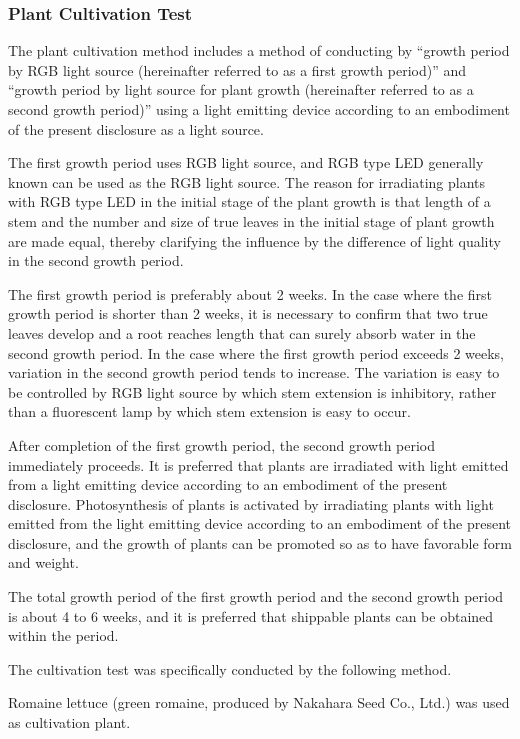 \documentclass[11pt,a4paper]{article}
\begin{document}
\subsubsection{Plant Cultivation Test}

The plant cultivation method includes a method of conducting by “growth period by RGB light source (hereinafter referred to as a first growth period)” and “growth period by light source for plant growth (hereinafter referred to as a second growth period)” using a light emitting device according to an embodiment of the present disclosure as a light source.

The first growth period uses RGB light source, and RGB type LED generally known can be used as the RGB light source. The reason for irradiating plants with RGB type LED in the initial stage of the plant growth is that length of a stem and the number and size of true leaves in the initial stage of plant growth are made equal, thereby clarifying the influence by the difference of light quality in the second growth period.

The first growth period is preferably about 2 weeks. In the case where the first growth period is shorter than 2 weeks, it is necessary to confirm that two true leaves develop and a root reaches length that can surely absorb water in the second growth period. In the case where the first growth period exceeds 2 weeks, variation in the second growth period tends to increase. The variation is easy to be controlled by RGB light source by which stem extension is inhibitory, rather than a fluorescent lamp by which stem extension is easy to occur.

After completion of the first growth period, the second growth period immediately proceeds. It is preferred that plants are irradiated with light emitted from a light emitting device according to an embodiment of the present disclosure. Photosynthesis of plants is activated by irradiating plants with light emitted from the light emitting device according to an embodiment of the present disclosure, and the growth of plants can be promoted so as to have favorable form and weight.

The total growth period of the first growth period and the second growth period is about 4 to 6 weeks, and it is preferred that shippable plants can be obtained within the period.

The cultivation test was specifically conducted by the following method.

Romaine lettuce (green romaine, produced by Nakahara Seed Co., Ltd.) was used as cultivation plant.
\end{document}

